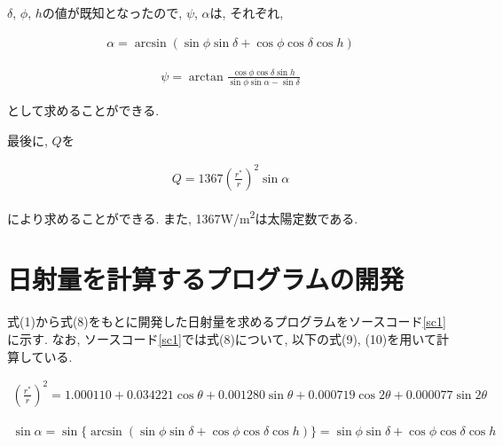 \documentclass[a4j,12pt,]{jarticle}
\begin{document}
$\delta$, $\phi$, $h$の値が既知となったので, $\psi$, $\alpha$は, それぞれ,

\begin{eqnarray}
  \alpha = \arcsin (\sin \phi\sin \delta+\cos \phi\cos \delta\cos h)
\end{eqnarray}

\begin{eqnarray}
  \psi = \arctan \frac{\cos \phi\cos \delta\sin h}{\sin \phi\sin \alpha-\sin \delta}
\end{eqnarray}

として求めることができる.

最後に, $Q$を

\begin{eqnarray}
  Q = 1367(\frac{r^{*}}{r})^{2}\sin \alpha
\end{eqnarray}

により求めることができる.
また, 1367\si{\watt}/\si{\metre\squared}は太陽定数である.

\section{日射量を計算するプログラムの開発}
式(1)から式(8)をもとに開発した日射量を求めるプログラムをソースコード\ref{sc1}に示す.
なお, ソースコード\ref{sc1}では式(8)について, 以下の式(9), (10)を用いて計算している.

\begin{eqnarray}
  (\frac{r^{*}}{r})^{2} = 1.000110+0.034221\cos \theta+0.001280\sin \theta+0.000719\cos 2\theta+0.000077\sin 2\theta
\end{eqnarray}

\begin{eqnarray}
  \sin \alpha = \sin \{\arcsin (\sin \phi\sin \delta+\cos \phi\cos \delta\cos h)\} = \sin \phi\sin \delta+\cos \phi\cos \delta\cos h
\end{eqnarray}
\end{document}
